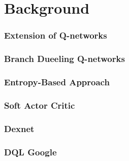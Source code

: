 
\chapter{Background}\label{chapter:background}


    
    
    

        


        \subsection{Extension of Q-networks}
        \subsection{Branch Dueeling Q-networks}

        \subsection{Entropy-Based Approach}
        \subsection{Soft Actor Critic}




    \subsection{Dexnet}
    \subsection{DQL Google}
